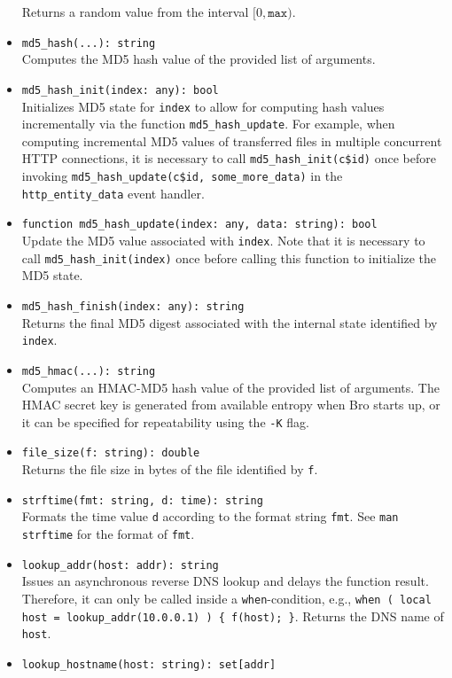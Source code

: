 \documentclass[10pt,landscape]{article}
\begin{document}
\begin{multicols*}{2}
\begin{itemize}
    Returns a random value from the interval $[0, \mathtt{max})$.
  \item \verb|md5_hash(...): string|\\
    Computes the MD5 hash value of the provided list of arguments.
  \item \verb|md5_hash_init(index: any): bool|\\
    Initializes MD5 state for \verb|index| to allow for computing hash values
    incrementally via the function \verb|md5_hash_update|. For example, when
    computing incremental MD5 values of transferred files in multiple
    concurrent HTTP connections, it is necessary to call
    \verb|md5_hash_init(c$id)| once before invoking
    \verb|md5_hash_update(c$id, some_more_data)| in the \verb|http_entity_data|
    event handler.
  \item \verb|function md5_hash_update(index: any, data: string): bool|\\
    Update the MD5 value associated with \verb|index|. Note that it is
    necessary to call \verb|md5_hash_init(index)| once before calling this
    function to initialize the MD5 state.
  \item \verb|md5_hash_finish(index: any): string|\\
    Returns the final MD5 digest associated with the internal state identified
    by \verb|index|.
  \item \verb|md5_hmac(...): string|\\
    Computes an HMAC-MD5 hash value of the provided list of arguments. The HMAC
    secret key is generated from available entropy when Bro starts up, or it
    can be specified for repeatability using the \texttt{-K} flag.
  \item \verb|file_size(f: string): double|\\
    Returns the file size in bytes of the file identified by \verb|f|.
  \item \verb|strftime(fmt: string, d: time): string|\\
    Formats the time value \verb|d| according to the format string \verb|fmt|.
    See \verb|man strftime| for the format of \verb|fmt|.
  \item \verb|lookup_addr(host: addr): string|\\
    Issues an asynchronous reverse DNS lookup and delays the function result.
    Therefore, it can only be called inside a \verb|when|-condition, e.g.,
    \verb|when ( local host = lookup_addr(10.0.0.1) ) { f(host); }|.
    Returns the DNS name of \verb|host|.
  \item \verb|lookup_hostname(host: string): set[addr]|\\

\end{itemize}
\end{multicols*}
\end{document}
